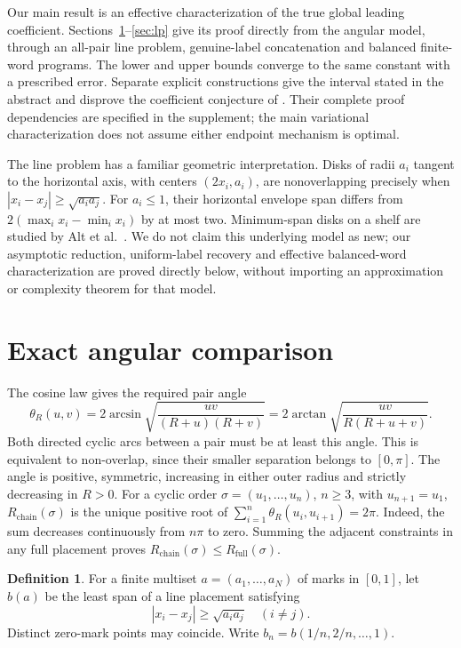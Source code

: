 \documentclass[11pt]{article}
\theoremstyle{definition}\newtheorem{definition}[theorem]{Definition}
\theoremstyle{remark}\newtheorem{remark}[theorem]{Remark}
\newcommand{\ch}{R_{\mathrm{chain}}}
\newcommand{\full}{R_{\mathrm{full}}}
\DeclareMathOperator{\atan}{arctan}
\DeclareMathOperator{\asin}{arcsin}
\begin{document}
Our main result is an effective characterization of the true global leading
coefficient. Sections~\ref{sec:line}--\ref{sec:lp} give its proof directly
from the angular model, through an all-pair line problem, genuine-label
concatenation and balanced finite-word programs. The lower and upper bounds
converge to the same constant with a prescribed error. Separate explicit
constructions give the interval stated in the abstract and disprove the
coefficient conjecture of \cite{v1}. Their complete proof dependencies are
specified in the supplement; the main variational characterization does
not assume either endpoint mechanism is optimal.

The line problem has a familiar geometric interpretation. Disks of radii
$a_i$ tangent to the horizontal axis, with centers $(2x_i,a_i)$, are
nonoverlapping precisely when $|x_i-x_j|\ge\sqrt{a_i a_j}$.
For $a_i\le1$, their horizontal envelope span differs from
$2(\max_i x_i-\min_i x_i)$ by at most two. Minimum-span disks on a shelf
are studied by Alt et al.\ \cite{shelf}. We do not claim this underlying
model as new; our asymptotic reduction, uniform-label recovery and effective
balanced-word characterization are proved directly below, without importing
an approximation or complexity theorem for that model.

\section{Exact angular comparison}\label{sec:line}

The cosine law gives the required pair angle
\begin{equation}\label{eq:theta}
 \theta_R(u,v)=2\asin\sqrt{\frac{uv}{(R+u)(R+v)}}
 =2\atan\sqrt{\frac{uv}{R(R+u+v)}}.
\end{equation}
Both directed cyclic arcs between a pair must be at least this angle.
This is equivalent to non-overlap, since their smaller separation belongs
to $[0,\pi]$. The angle is positive, symmetric, increasing in either
outer radius and strictly decreasing in $R>0$.
For a cyclic order $\sigma=(u_1,\ldots,u_n)$, $n\ge3$, with $u_{n+1}=u_1$,
$\ch(\sigma)$ is the unique positive root of
$\sum_{i=1}^n\theta_R(u_i,u_{i+1})=2\pi$.
Indeed, the sum decreases continuously from $n\pi$ to zero. Summing the
adjacent constraints in any full placement proves $\ch(\sigma)\le\full(\sigma)$.

\begin{definition}
For a finite multiset $a=(a_1,\ldots,a_N)$ of marks in $[0,1]$, let $b(a)$
be the least span of a line placement satisfying
\begin{equation}\label{eq:line}
 |x_i-x_j|\ge\sqrt{a_i a_j}\quad(i\ne j).
\end{equation}
Distinct zero-mark points may coincide. Write $b_n=b(1/n,2/n,\ldots,1)$.
\end{definition}
\end{document}
